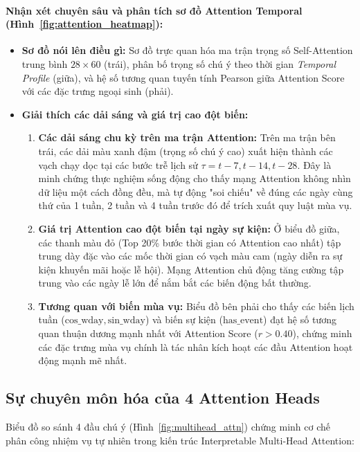 \documentclass[12pt,a4paper,oneside]{article}
\begin{document}
\paragraph{Nhận xét chuyên sâu và phân tích sơ đồ Attention Temporal (Hình~\ref{fig:attention_heatmap}):}
\begin{itemize}
    \item \textbf{Sơ đồ nói lên điều gì:} Sơ đồ trực quan hóa ma trận trọng số Self-Attention trung bình $28 \times 60$ (trái), phân bố trọng số chú ý theo thời gian \textit{Temporal Profile} (giữa), và hệ số tương quan tuyến tính Pearson giữa Attention Score với các đặc trưng ngoại sinh (phải).
    \item \textbf{Giải thích các dải sáng và giá trị cao đột biến:}
    \begin{enumerate}
        \item \textbf{Các dải sáng chu kỳ trên ma trận Attention:} Trên ma trận bên trái, các dải màu xanh đậm (trọng số chú ý cao) xuất hiện thành các vạch chạy dọc tại các bước trễ lịch sử $\tau = t-7, t-14, t-28$. Đây là minh chứng thực nghiệm sống động cho thấy mạng Attention không nhìn dữ liệu một cách đồng đều, mà tự động "soi chiếu" về đúng các ngày cùng thứ của 1 tuần, 2 tuần và 4 tuần trước đó để trích xuất quy luật mùa vụ.
        \item \textbf{Giá trị Attention cao đột biến tại ngày sự kiện:} Ở biểu đồ giữa, các thanh màu đỏ (Top 20\% bước thời gian có Attention cao nhất) tập trung dày đặc vào các mốc thời gian có vạch màu cam (ngày diễn ra sự kiện khuyến mãi hoặc lễ hội). Mạng Attention chủ động tăng cường tập trung vào các ngày lễ lớn để nắm bắt các biến động bất thường.
        \item \textbf{Tương quan với biến mùa vụ:} Biểu đồ bên phải cho thấy các biến lịch tuần ($\mathrm{cos\_wday}, \mathrm{sin\_wday}$) và biến sự kiện ($\mathrm{has\_event}$) đạt hệ số tương quan thuận dương mạnh nhất với Attention Score ($r > 0.40$), chứng minh các đặc trưng mùa vụ chính là tác nhân kích hoạt các đầu Attention hoạt động mạnh mẽ nhất.
    \end{enumerate}
\end{itemize}

\subsection{Sự chuyên môn hóa của 4 Attention Heads}
Biểu đồ so sánh 4 đầu chú ý (Hình~\ref{fig:multihead_attn}) chứng minh cơ chế phân công nhiệm vụ tự nhiên trong kiến trúc Interpretable Multi-Head Attention:
\end{document}
